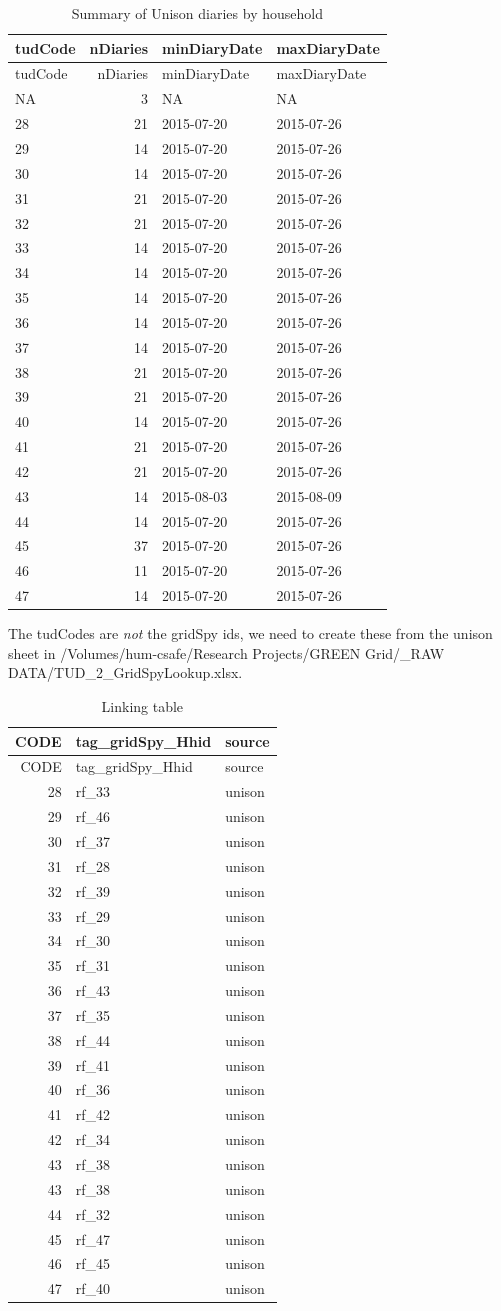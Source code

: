\documentclass[]{article}
\begin{document}
\begin{longtable}[]{@{}lrll@{}}
\caption{Summary of Unison diaries by household}\tabularnewline
\toprule
tudCode & nDiaries & minDiaryDate & maxDiaryDate\tabularnewline
\midrule
\endfirsthead
\toprule
tudCode & nDiaries & minDiaryDate & maxDiaryDate\tabularnewline
\midrule
\endhead
NA & 3 & NA & NA\tabularnewline
28 & 21 & 2015-07-20 & 2015-07-26\tabularnewline
29 & 14 & 2015-07-20 & 2015-07-26\tabularnewline
30 & 14 & 2015-07-20 & 2015-07-26\tabularnewline
31 & 21 & 2015-07-20 & 2015-07-26\tabularnewline
32 & 21 & 2015-07-20 & 2015-07-26\tabularnewline
33 & 14 & 2015-07-20 & 2015-07-26\tabularnewline
34 & 14 & 2015-07-20 & 2015-07-26\tabularnewline
35 & 14 & 2015-07-20 & 2015-07-26\tabularnewline
36 & 14 & 2015-07-20 & 2015-07-26\tabularnewline
37 & 14 & 2015-07-20 & 2015-07-26\tabularnewline
38 & 21 & 2015-07-20 & 2015-07-26\tabularnewline
39 & 21 & 2015-07-20 & 2015-07-26\tabularnewline
40 & 14 & 2015-07-20 & 2015-07-26\tabularnewline
41 & 21 & 2015-07-20 & 2015-07-26\tabularnewline
42 & 21 & 2015-07-20 & 2015-07-26\tabularnewline
43 & 14 & 2015-08-03 & 2015-08-09\tabularnewline
44 & 14 & 2015-07-20 & 2015-07-26\tabularnewline
45 & 37 & 2015-07-20 & 2015-07-26\tabularnewline
46 & 11 & 2015-07-20 & 2015-07-26\tabularnewline
47 & 14 & 2015-07-20 & 2015-07-26\tabularnewline
\bottomrule
\end{longtable}

The tudCodes are \emph{not} the gridSpy ids, we need to create these
from the unison sheet in /Volumes/hum-csafe/Research Projects/GREEN
Grid/\_RAW DATA/TUD\_2\_GridSpyLookup.xlsx.

\begin{longtable}[]{@{}rll@{}}
\caption{Linking table}\tabularnewline
\toprule
CODE & tag\_gridSpy\_Hhid & source\tabularnewline
\midrule
\endfirsthead
\toprule
CODE & tag\_gridSpy\_Hhid & source\tabularnewline
\midrule
\endhead
28 & rf\_33 & unison\tabularnewline
29 & rf\_46 & unison\tabularnewline
30 & rf\_37 & unison\tabularnewline
31 & rf\_28 & unison\tabularnewline
32 & rf\_39 & unison\tabularnewline
33 & rf\_29 & unison\tabularnewline
34 & rf\_30 & unison\tabularnewline
35 & rf\_31 & unison\tabularnewline
36 & rf\_43 & unison\tabularnewline
37 & rf\_35 & unison\tabularnewline
38 & rf\_44 & unison\tabularnewline
39 & rf\_41 & unison\tabularnewline
40 & rf\_36 & unison\tabularnewline
41 & rf\_42 & unison\tabularnewline
42 & rf\_34 & unison\tabularnewline
43 & rf\_38 & unison\tabularnewline
43 & rf\_38 & unison\tabularnewline
44 & rf\_32 & unison\tabularnewline
45 & rf\_47 & unison\tabularnewline
46 & rf\_45 & unison\tabularnewline
47 & rf\_40 & unison\tabularnewline
\bottomrule
\end{longtable}
\end{document}

